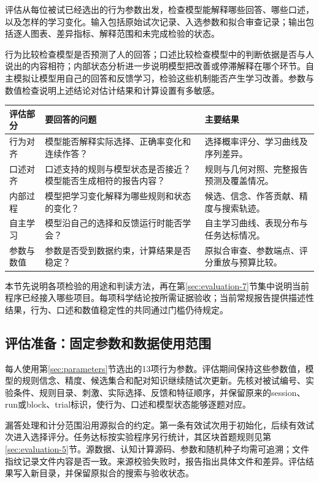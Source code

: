 \documentclass[12pt]{article}
\begin{document}
评估从每位被试已经选出的行为参数出发，检查模型能解释哪些回答、哪些口述，以及怎样的学习变化。输入包括原始试次记录、入选参数和拟合审查记录；输出包括逐人图表、差异指标、解释范围和未完成检验的状态。

行为比较检查模型是否预测了人的回答；口述比较检查模型中的判断依据是否与人说出的内容相符；内部状态分析进一步说明模型把改善或停滞解释在哪个环节。自主模拟让模型用自己的回答和反馈学习，检验这些机制能否产生学习改善。参数与数值检查说明上述结论对估计结果和计算设置有多敏感。

{\small
\begin{longtable}{L{2.6cm}L{6.1cm}L{4.6cm}}
\toprule
评估部分 & 要回答的问题 & 主要结果\\
\midrule
\endhead
行为对齐 & 模型能否解释实际选择、正确率变化和连续作答？ & 选择概率评分、学习曲线及序列差异。\\
口述对齐 & 口述支持的规则与模型状态是否接近？模型能否生成相符的报告内容？ & 规则与几何对照、完整报告预测及覆盖情况。\\
内部过程 & 模型把学习变化解释为哪些规则和状态的变化？ & 候选、信念、作答贡献、精度与搜索轨迹。\\
自主学习 & 模型沿自己的选择和反馈运行时能否学会？ & 自主学习曲线、表现分布与任务达标情况。\\
参数与数值 & 参数是否受到数据约束，计算结果是否稳定？ & 原拟合审查、参数端点、评分重放与预算比较。\\
\bottomrule
\end{longtable}
}


本节先说明各项检验的用途和判读方法，再在第\ref{sec:evaluation-7}节集中说明当前程序已经接入哪些项目。每项科学结论按所需证据验收；当前常规报告提供描述性结果，行为、口述和数值稳定性的共同通过门槛仍待规定。

\subsection{评估准备：固定参数和数据使用范围}
\label{sec:evaluation-1}

每人使用第\ref{sec:parameters}节选出的13项行为参数。评估期间保持这些参数值，模型的规则信念、精度、候选集合和配对知识继续随试次更新。先核对被试编号、实验条件、规则目录、刺激、实际选择、反馈和特征顺序，并保留原来的session、run或block、trial标识，使行为、口述和模型状态能够逐题对应。

漏答处理和计分范围沿用源拟合的约定。第一条有效试次用于初始化，后续有效试次进入选择评分。任务达标按实验程序另行统计，其区块首题规则见第\ref{sec:evaluation-5}节。源数据、认知计算源码、参数和随机种子均需可追溯；文件指纹记录文件内容是否一致。来源校验失败时，报告指出具体文件和差异。评估结果写入新目录，并保留原拟合的搜索与验收状态。
\end{document}
